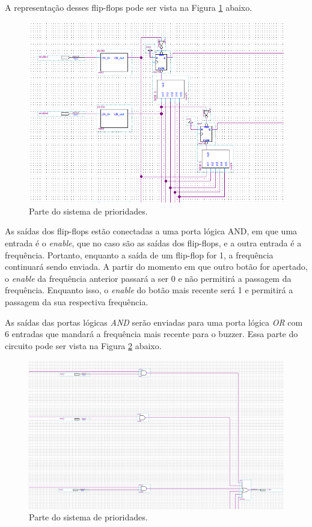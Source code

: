 A representação desses flip-flops pode ser vista na Figura \ref{fig:2.17} abaixo.

\begin{figure}[H]
	\centering
	\includegraphics[width=1\columnwidth]{FIGURAS/cap_2/prioridade_enable.png}
	\caption{Parte do sistema de prioridades.}
        \label{fig:2.17}
\end{figure}

As saídas dos flip-flops estão conectadas a uma porta lógica AND, em que uma entrada é o \emph{enable}, que no caso são as saídas dos flip-flops, e a outra entrada é a frequência. Portanto, enquanto a saída de um flip-flop for 1, a frequência continuará sendo enviada. A partir do momento em que outro botão for apertado, o \emph{enable} da frequência anterior passará a ser 0 e não permitirá a passagem da frequência. Enquanto isso, o \emph{enable} do botão mais recente será 1 e permitirá a passagem da sua respectiva frequência.

As saídas das portas lógicas \emph{AND} serão enviadas para uma porta lógica \emph{OR} com 6 entradas que mandará a frequência mais recente para o buzzer. Essa parte do circuito pode ser vista na Figura \ref{fig:2.18} abaixo.

\begin{figure}[H]
	\centering
	\includegraphics[width=1\columnwidth]{FIGURAS/cap_2/prioridade_f.png}
	\caption{Parte do sistema de prioridades.}
        \label{fig:2.18}
\end{figure}



